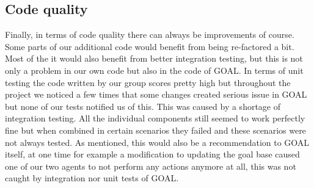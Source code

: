 \documentclass[11pt]{article}
\begin{document}
\subsection{Code quality}
Finally, in terms of code quality there can always be improvements of course. Some parts of our additional code would benefit from being re-factored a bit. Most of the it would also benefit from better integration testing, but this is not only a problem in our own code but also in the code of GOAL. In terms of unit testing the code written by our group scores pretty high but throughout the project we noticed a few times that some changes created serious issue in GOAL but none of our tests notified us of this. This was caused by a shortage of integration testing. All the individual components still seemed to work perfectly fine but when combined in certain scenarios they failed and these scenarios were not always tested. As mentioned, this would also be a recommendation to GOAL itself, at one time for example a modification to updating the goal base caused one of our two agents to not perform any actions anymore at all, this was not caught by integration nor unit tests of GOAL.

\clearpage
\printglossaries
\end{document}
